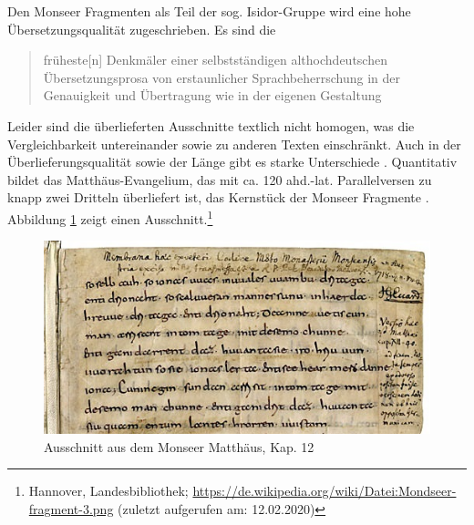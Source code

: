 Den Monseer Fragmenten als Teil der sog. Isidor-Gruppe wird eine hohe Übersetzungsqualität zugeschrieben. Es sind die \blockcquote[129]{Sonderegger2003}{früheste[n] Denkmäler einer selbstständigen althochdeutschen Übersetzungsprosa von erstaunlicher Sprachbeherrschung in der Genauigkeit und Übertragung wie in der eigenen Gestaltung}. 
Leider sind die überlieferten Ausschnitte textlich nicht homogen, was die Vergleichbarkeit untereinander sowie zu anderen Texten einschränkt. Auch in der Überlieferungsqualität sowie der Länge gibt es starke Unterschiede \parencite[s. ausführlich][]{Krotz2002,Krotz2003}. Quantitativ bildet das Matthäus-Evangelium, das mit ca. 120 ahd.-lat. Parallelversen zu knapp zwei Dritteln überliefert ist, das Kernstück der Monseer Fragmente 
\parencites()()[82]{Matzel1970}[26f.]{Schlachter2012}.
Abbildung \ref{abb:MF-handschrift} zeigt einen Ausschnitt.\footnote{Hannover, Landesbibliothek; \url{https://de.wikipedia.org/wiki/Datei:Mondseer-fragment-3.png} (zuletzt aufgerufen am: 12.02.2020)} 

\begin{figure}[h]
\begin{center}
  \includegraphics[width=10 cm]{images/MF-handschrift-ausschnitt.jpg}
\caption {Ausschnitt aus dem Monseer Matthäus, Kap. 12}
\label{abb:MF-handschrift}
\end{center}
\end{figure} 




